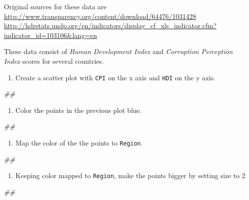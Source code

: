 \documentclass[]{book}
\newenvironment{Shaded}{\begin{snugshade}}{\end{snugshade}}
\newcommand{\CommentTok}[1]{\textcolor[rgb]{0.56,0.35,0.01}{\textit{#1}}}
\providecommand{\tightlist}{%
  \setlength{\itemsep}{0pt}\setlength{\parskip}{0pt}}
\begin{document}
Original sources for these data are \url{http://www.transparency.org/content/download/64476/1031428} \url{http://hdrstats.undp.org/en/indicators/display_cf_xls_indicator.cfm?indicator_id=103106\&lang=en}

These data consist of \emph{Human Development Index} and \emph{Corruption Perception Index} scores for several countries.

\begin{enumerate}
\def\labelenumi{\arabic{enumi}.}
\tightlist
\item
  Create a scatter plot with \texttt{CPI} on the x axis and \texttt{HDI} on the y axis.
\end{enumerate}

\begin{Shaded}
\begin{Highlighting}[]
\CommentTok{## }
\end{Highlighting}
\end{Shaded}

\begin{enumerate}
\def\labelenumi{\arabic{enumi}.}
\setcounter{enumi}{1}
\tightlist
\item
  Color the points in the previous plot blue.
\end{enumerate}

\begin{Shaded}
\begin{Highlighting}[]
\CommentTok{## }
\end{Highlighting}
\end{Shaded}

\begin{enumerate}
\def\labelenumi{\arabic{enumi}.}
\setcounter{enumi}{2}
\tightlist
\item
  Map the color of the the points to \texttt{Region}.
\end{enumerate}

\begin{Shaded}
\begin{Highlighting}[]
\CommentTok{## }
\end{Highlighting}
\end{Shaded}

\begin{enumerate}
\def\labelenumi{\arabic{enumi}.}
\setcounter{enumi}{3}
\tightlist
\item
  Keeping color mapped to \texttt{Region}, make the points bigger by setting size to 2
\end{enumerate}

\begin{Shaded}
\begin{Highlighting}[]
\CommentTok{## }
\end{Highlighting}
\end{Shaded}
\end{document}

